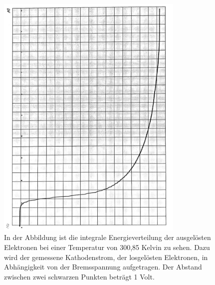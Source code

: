 \documentclass[titlepage = firstcover]{scrartcl}
\begin{document}
                \begin{figure}[h]
                  \centering
                  \includegraphics[width = 0.8\textwidth, angle=90]{T300.pdf}
                  \caption{In der Abbildung ist die integrale Energieverteilung der ausgelösten Elektronen bei einer Temperatur von 300,85 Kelvin zu sehen. Dazu wird der gemessene Kathodenstrom, der losgelösten Elektronen, in Abhängigkeit von der Bremsspannung aufgetragen. Der Abstand zwischen zwei schwarzen Punkten beträgt 1 Volt.}
                  \label{fig:Bild300}
                \end{figure}
\end{document}
